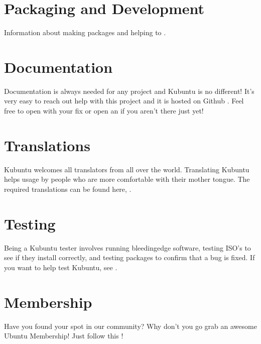 \documentclass[letterpaper,10pt,english]{sphinxmanual}
\begin{document}
\section{Packaging and Development}
\label{\detokenize{docs/contribute:packaging-and-development}}
\sphinxAtStartPar
Information about making packages and helping to .


\section{Documentation}
\label{\detokenize{docs/contribute:documentation}}
\sphinxAtStartPar
Documentation is always needed for any project and Kubuntu is no different! It’s very easy to reach out help with this project and it is hosted on Github . Feel free to open  with your fix or open an  if you aren’t there just yet!


\section{Translations}
\label{\detokenize{docs/contribute:translations}}
\sphinxAtStartPar
Kubuntu welcomes all translators from all over the world. Translating Kubuntu helps usage by people who are more comfortable with their mother tongue. The required translations can be found here, .


\section{Testing}
\label{\detokenize{docs/contribute:testing}}
\sphinxAtStartPar
Being a Kubuntu tester involves running bleeding\sphinxhyphen{}edge software, testing ISO’s to see if they install correctly, and testing packages to confirm that a bug is fixed. If you want to help test Kubuntu, see .


\section{Membership}
\label{\detokenize{docs/contribute:membership}}
\sphinxAtStartPar
Have you found your spot in our community? Why don’t you go grab an awesome Ubuntu Membership! Just follow this !
\end{document}

